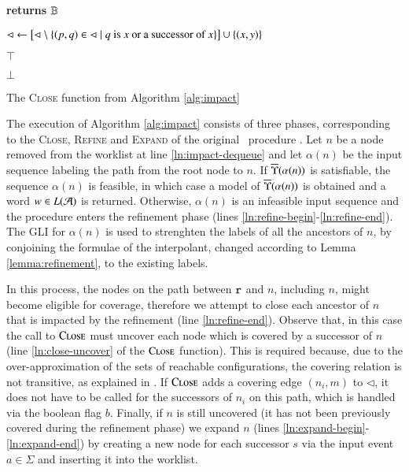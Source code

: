 \begin{algorithm}[htb]
\begin{algorithmic}[1]
 {\bf returns} $\mathbb{B}$



\State $\lhd \leftarrow \left[\lhd \setminus \{  (p,q) \in \lhd \mid
  \text{$q$ is $x$ or a successor of $x$} \}\right] \cup \{ (x,y) \}$
\label{ln:close-uncover}

 $\top$ 

\EndIf

\EndFor

 $\bot$

\EndFunction
\end{algorithmic}
\caption{The \textsc{Close} function from Algorithm \ref{alg:impact}}
\end{algorithm}

The execution of Algorithm \ref{alg:impact} consists of three phases,
corresponding to the \textsc{Close}, \textsc{Refine} and
\textsc{Expand} of the original \impact\ procedure \cite{McMillan06}.
Let $n$ be a node removed from the worklist at line
\ref{ln:impact-dequeue} and let $\alpha(n)$ be the input sequence
labeling the path from the root node to $n$. If
$\overline{\Upsilon}({\alpha(n)})$ is satisfiable, the sequence $\alpha(n)$ is
feasible, in which case a model of $\overline{\Upsilon}({\alpha(n)})$ is obtained
and a word $w \in L(\mathcal{A})$ is returned. Otherwise, $\alpha(n)$ is an
infeasible input sequence and the procedure enters the refinement
phase (lines \ref{ln:refine-begin}-\ref{ln:refine-end}). The GLI for
$\alpha(n)$ is used to strenghten the labels of all the ancestors of
$n$, by conjoining the formulae of the interpolant, changed according
to Lemma \ref{lemma:refinement}, to the existing labels.

In this process, the nodes on the path between $\mathtt{r}$ and $n$,
including $n$, might become eligible for coverage, therefore we
attempt to close each ancestor of $n$ that is impacted by the
refinement (line \ref{ln:refine-end}). Observe that, in this case the
call to $\Call{Close}{}$ must uncover each node which is covered by a
successor of $n$ (line \ref{ln:close-uncover} of the $\Call{Close}{}$
function). This is required because, due to the over-approximation of
the sets of reachable configurations, the covering relation is not
transitive, as explained in \cite{McMillan06}. If $\Call{Close}{}$
adds a covering edge $(n_i,m)$ to $\lhd$, it does not have to be
called for the successors of $n_i$ on this path, which is handled via
the boolean flag $b$. Finally, if $n$ is still uncovered (it has not
been previously covered during the refinement phase) we expand $n$
(lines \ref{ln:expand-begin}-\ref{ln:expand-end}) by creating a new
node for each successor $s$ via the input event $a \in \Sigma$ and
inserting it into the worklist.

